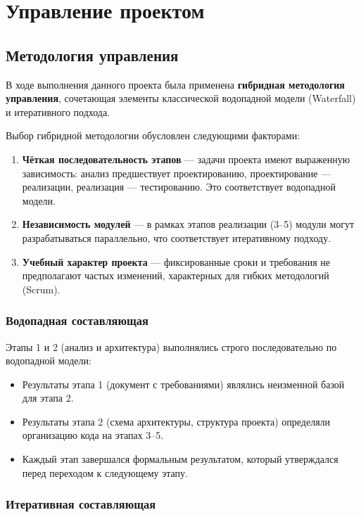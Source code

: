 \chapter{Управление проектом}

\section{Методология управления}

В ходе выполнения данного проекта была применена \textbf{гибридная методология управления}, сочетающая элементы классической водопадной модели (Waterfall) и итеративного подхода.

Выбор гибридной методологии обусловлен следующими факторами:

\begin{enumerate}
    \item \textbf{Чёткая последовательность этапов} — задачи проекта имеют выраженную зависимость: анализ предшествует проектированию, проектирование — реализации, реализация — тестированию. Это соответствует водопадной модели.
    \item \textbf{Независимость модулей} — в рамках этапов реализации (3--5) модули могут разрабатываться параллельно, что соответствует итеративному подходу.
    \item \textbf{Учебный характер проекта} — фиксированные сроки и требования не предполагают частых изменений, характерных для гибких методологий (Scrum).
\end{enumerate}

\subsection{Водопадная составляющая}

Этапы 1 и 2 (анализ и архитектура) выполнялись строго последовательно по водопадной модели:

\begin{itemize}
    \item Результаты этапа 1 (документ с требованиями) являлись неизменной базой для этапа 2.
    \item Результаты этапа 2 (схема архитектуры, структура проекта) определяли организацию кода на этапах 3--5.
    \item Каждый этап завершался формальным результатом, который утверждался перед переходом к следующему этапу.
\end{itemize}

\subsection{Итеративная составляющая}

